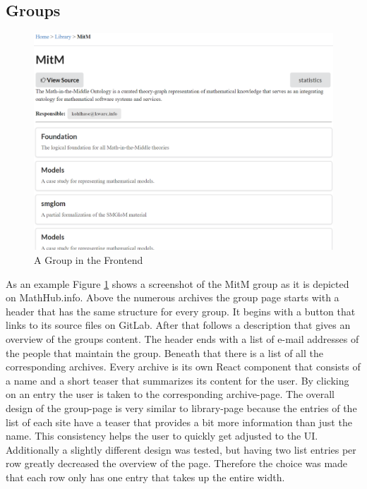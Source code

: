 \documentclass[11pt,a4paper]{article}
\begin{document}
\subsection{Groups}
\begin{figure}[H]
\includegraphics[width=1\textwidth]{group.png}
\caption{A Group in the Frontend}
\label{fig:group}
\end{figure}
As an example Figure \ref{fig:group} shows a screenshot of the MitM group as it is depicted on MathHub.info.
Above the numerous archives the group page starts with a header that has the same structure for every group.
It begins with a button that links to its source files on GitLab.
After that follows a description that gives an overview of the groups content.
The header ends with a list of e-mail addresses of the people that maintain the group.
\newline \newline
Beneath that there is a list of all the corresponding archives.
Every archive is its own React component that consists of a name and a short teaser that summarizes its content for the user.
By clicking on an entry the user is taken to the corresponding archive-page.
The overall design of the group-page is very similar to library-page because the entries of the list of each site have a teaser that provides a bit more information than just the name.
This consistency helps the user to quickly get adjusted to the UI.
Additionally a slightly different design was tested, but having two list entries per row greatly decreased the overview of the page.
Therefore the choice was made that each row only has one entry that takes up the entire width.
\end{document}
